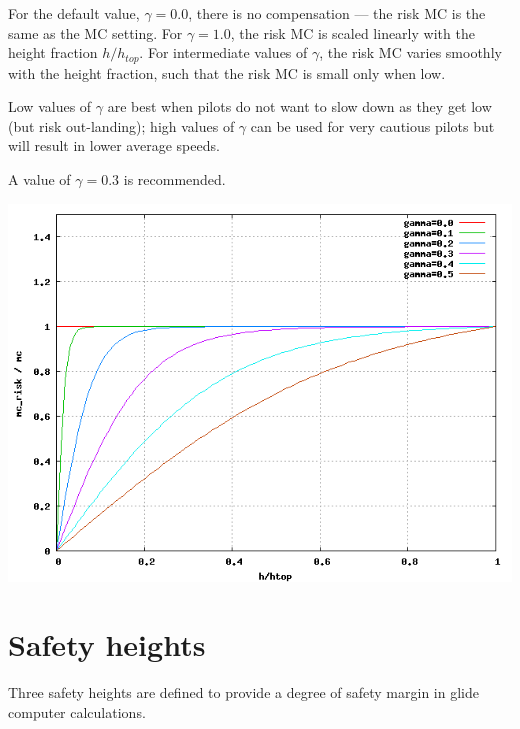   For the default value, $\gamma=0.0$, there is no compensation ---
  the risk MC is the same as the MC setting.  For $\gamma=1.0$, the
  risk MC is scaled linearly with the height fraction $h/h_{top}$.
  For intermediate values of $\gamma$, the risk MC varies smoothly
  with the height fraction, such that the risk MC is small only when
  low.

  Low values of $\gamma$ are best when pilots do not want to slow down
  as they get low (but risk out-landing); high values of $\gamma$ can
  be used for very cautious pilots but will result in lower average
  speeds.

  A value of $\gamma=0.3$ is recommended.

\begin{center}
\includegraphics[angle=0,width=\linewidth,keepaspectratio='true']{figures/riskmc.png}
\end{center}

\section{Safety heights}\label{sec:safety-heights}

Three safety heights are defined to provide a degree of safety margin
in glide computer calculations.  


